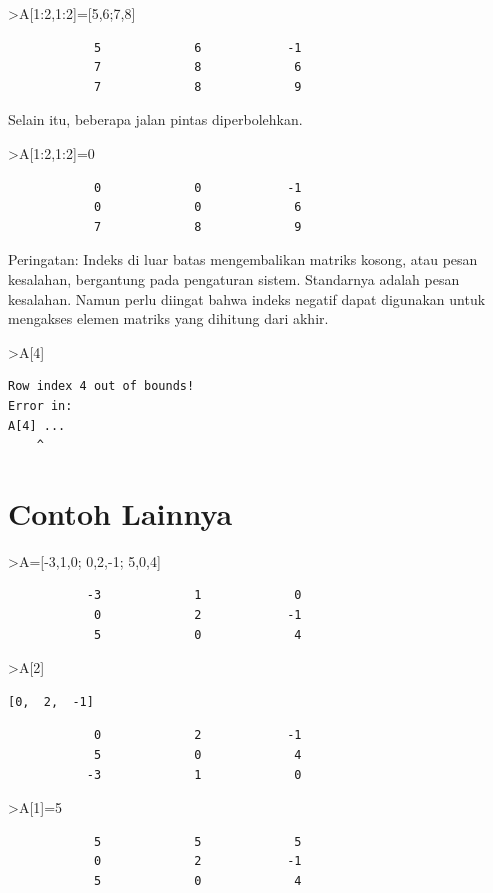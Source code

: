 \documentclass[
]{book}
\begin{document}
\textgreater A{[}1:2,1:2{]}={[}5,6;7,8{]}

\begin{verbatim}
            5             6            -1 
            7             8             6 
            7             8             9 
\end{verbatim}

Selain itu, beberapa jalan pintas diperbolehkan.

\textgreater A{[}1:2,1:2{]}=0

\begin{verbatim}
            0             0            -1 
            0             0             6 
            7             8             9 
\end{verbatim}

Peringatan: Indeks di luar batas mengembalikan matriks kosong, atau pesan kesalahan, bergantung pada pengaturan sistem. Standarnya adalah pesan kesalahan. Namun perlu diingat bahwa indeks negatif dapat digunakan untuk mengakses elemen matriks yang dihitung dari akhir.

\textgreater A{[}4{]}

\begin{verbatim}
Row index 4 out of bounds!
Error in:
A[4] ...
    ^
\end{verbatim}

\chapter{Contoh Lainnya}\label{contoh-lainnya-13}

\textgreater A={[}-3,1,0; 0,2,-1; 5,0,4{]}

\begin{verbatim}
           -3             1             0 
            0             2            -1 
            5             0             4 
\end{verbatim}

\textgreater A{[}2{]}

\begin{verbatim}
[0,  2,  -1]
\end{verbatim}

\begin{verbatim}
            0             2            -1 
            5             0             4 
           -3             1             0 
\end{verbatim}

\textgreater A{[}1{]}=5

\begin{verbatim}
            5             5             5 
            0             2            -1 
            5             0             4 
\end{verbatim}
\end{document}
